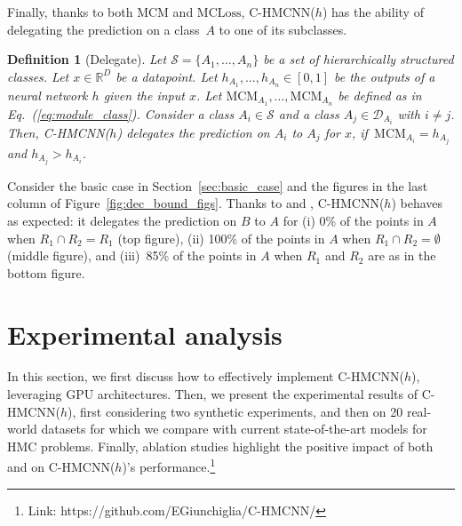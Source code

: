 \documentclass{article}
\newcommand{\module}{\text{MCM}}
\newcommand{\loss}{\text{MCLoss}}
\newcommand{\system}[1]{C-HMCNN(#1)}
\newtheorem{definition}[theorem]{Definition}
\begin{document}
Finally, thanks to both $\module$ and $\loss$, \system{$h$} has the ability of delegating the prediction on a class~$A$ to one of its subclasses.
\begin{definition}[Delegate]{\rm 
Let $\mathcal{S} = \{A_1, \ldots, A_n\}$ be a set of hierarchically structured classes. Let $x \in \mathbb{R}^D$ be a datapoint. Let $h_{A_1}, \ldots, h_{A_n} \in [0,1]$ be the outputs of a neural network $h$ given the input $x$. Let 
$\module_{A_1}, \ldots, \module_{A_n}$ be defined as in Eq.~(\ref{eq:module_class}).
 Consider a class $A_i \in \mathcal{S}$ and a class $A_j \in {\mathcal D}_{A_i}$ with $i \neq j$. Then, \system{$h$} \emph{delegates} the prediction on  $A_i$ to $A_j$ for $x$, if~$\module_{A_i} = h_{A_j}$ and $h_{A_j} >  h_{A_i}$.} 
\end{definition}
Consider the basic case in Section~\ref{sec:basic_case} and the figures in the last column of  Figure~\ref{fig:dec_bound_figs}. Thanks to \module{} and \loss{}, \system{$h$} behaves as expected: it delegates the prediction on $B$ to $A$ for (i) 0\% of the points in $A$ when $R_1 \cap R_2 = R_1$ (top figure), (ii) 100\% of the points in $A$ when $R_1 \cap R_2 = \emptyset$ (middle figure), and (iii)~85\% of the points in $A$ when $R_1$ and $R_2$ are as in the bottom figure.





























\section{Experimental analysis}\label{sec:experiments}

In this section, we first discuss how to effectively implement \system{$h$}, leveraging GPU architectures. Then, we present the experimental results of \system{$h$}, first considering two synthetic experiments, and then on 20 real-world datasets for which we compare with current state-of-the-art models for HMC problems. Finally, ablation studies highlight the positive impact of both \module{} and \loss{} on \system{$h$}'s performance.\footnote{Link:  {https://github.com/EGiunchiglia/C-HMCNN/}} 
\end{document}
